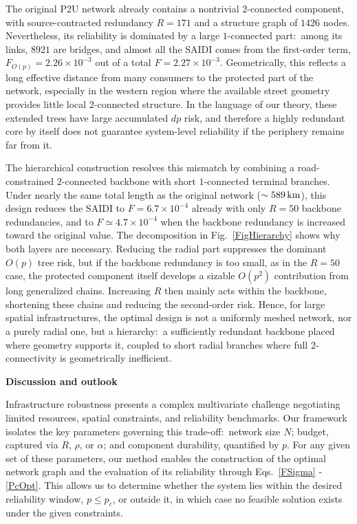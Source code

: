\documentclass[oneside, a4paper, onecolumn, 11pt]{article}
\begin{document}
\begin{refsection}
The original P2U network already contains a nontrivial $2$-connected component, with source-contracted redundancy $R = 171$ and a structure graph of $1426$ nodes. Nevertheless, its reliability is dominated by a large $1$-connected part:\ among its links, $8921$ are bridges, and almost all the SAIDI comes from the first-order term, $F_{O(p)} = 2.26 \times 10^{-3}$ out of a total $F = 2.27 \times 10^{-3}$. Geometrically, this reflects a long effective distance from many consumers to the protected part of the network, especially in the western region where the available street geometry provides little local $2$-connected structure. In the language of our theory, these extended trees have large accumulated $d p$ risk, and therefore a highly redundant core by itself does not guarantee system-level reliability if the periphery remains far from it.

The hierarchical construction resolves this mismatch by combining a road-constrained $2$-connected backbone with short $1$-connected terminal branches. Under nearly the same total length as the original network ($\sim 589\,{\rm km}$), this design reduces the SAIDI to $F = 6.7 \times 10^{-4}$ already with only $R = 50$ backbone redundancies, and to $F \simeq 4.7 \times 10^{-4}$ when the backbone redundancy is increased toward the original value. The decomposition in Fig.~\ref{FigHierarchy} shows why both layers are necessary. Reducing the radial part suppresses the dominant $O(p)$ tree risk, but if the backbone redundancy is too small, as in the $R = 50$ case, the protected component itself develops a sizable $O(p^2)$ contribution from long generalized chains. Increasing $R$ then mainly acts within the backbone, shortening these chains and reducing the second-order risk. Hence, for large spatial infrastructures, the optimal design is not a uniformly meshed network, nor a purely radial one, but a hierarchy:\ a sufficiently redundant backbone placed where geometry supports it, coupled to short radial branches where full $2$-connectivity is geometrically inefficient.



\vspace{3mm}
\textbf{\color{blue} \Large Discussion and outlook}

Infrastructure robustness presents a complex multivariate challenge negotiating limited resources, spatial constraints, and reliability benchmarks. Our framework isolates the key parameters governing this trade-off:\ network size $N$; budget, captured via $R$, $\rho$, or $\alpha$; and component durability, quantified by $p$. For any given set of these parameters, our method enables the construction of the optimal network graph and the evaluation of its reliability through Eqs.\ \eqref{FSigma} - \eqref{PcOpt}. This allows us to determine whether the system lies within the desired reliability window, $p \le p_c$, or outside it, in which case no feasible solution exists under the given constraints.


\end{refsection}
\end{document}
